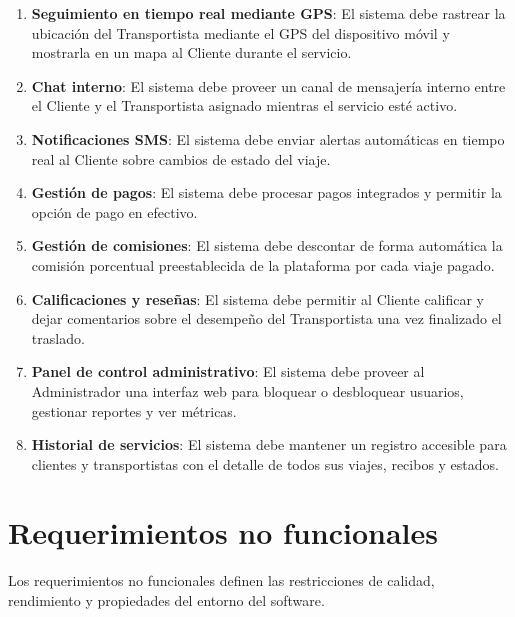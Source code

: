 \begin{enumerate}
 	\item \textbf{Seguimiento en tiempo real mediante GPS}: El sistema debe rastrear la ubicación del Transportista mediante el GPS del dispositivo móvil y mostrarla en un mapa al Cliente durante el servicio.
 	\item \textbf{Chat interno}: El sistema debe proveer un canal de mensajería interno entre el Cliente y el Transportista asignado mientras el servicio esté activo.
 	\item \textbf{Notificaciones SMS}: El sistema debe enviar alertas automáticas en tiempo real al Cliente sobre cambios de estado del viaje.
 	\item \textbf{Gestión de pagos}: El sistema debe procesar pagos integrados y permitir la opción de pago en efectivo.
 	\item \textbf{Gestión de comisiones}: El sistema debe descontar de forma automática la comisión porcentual preestablecida de la plataforma por cada viaje pagado.
 	\item \textbf{Calificaciones y reseñas}: El sistema debe permitir al Cliente calificar y dejar comentarios sobre el desempeño del Transportista una vez finalizado el traslado.
 	\item \textbf{Panel de control administrativo}: El sistema debe proveer al Administrador una interfaz web para bloquear o desbloquear usuarios, gestionar reportes y ver métricas.
 	\item \textbf{Historial de servicios}: El sistema debe mantener un registro accesible para clientes y transportistas con el detalle de todos sus viajes, recibos y estados.
 \end{enumerate}
 
 \section{Requerimientos no funcionales}
 
 Los requerimientos no funcionales definen las restricciones de calidad, rendimiento y propiedades del entorno del software.
 
